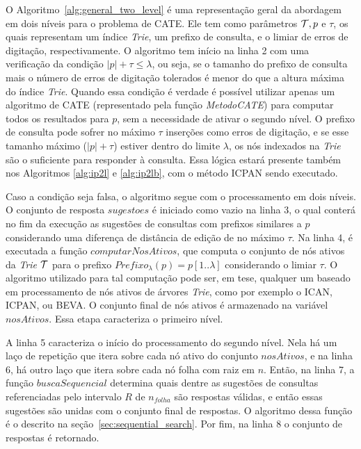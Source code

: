 O Algoritmo~\ref{alg:general_two_level} é uma representação geral da abordagem em dois níveis para o problema de CATE. Ele tem como parâmetros $\mathcal{T}, p$ e $\tau$, os quais representam um índice \textit{Trie}, um prefixo de consulta, e o limiar de erros de digitação, respectivamente. O algoritmo tem início na linha 2 com uma verificação da condição $|p| + \tau \leq \lambda$, ou seja, se o tamanho do prefixo de consulta mais o número de erros de digitação tolerados é menor do que a altura máxima do índice \textit{Trie}.
Quando essa condição é verdade é possível utilizar apenas um algoritmo de CATE (representado pela função \textit{MetodoCATE}) para computar todos os resultados para $p$, sem a necessidade de ativar o segundo nível. O prefixo de consulta pode sofrer no máximo $\tau$ inserções como erros de digitação, e se esse tamanho máximo ($|p| + \tau$) estiver dentro do limite $\lambda$, os nós indexados na \textit{Trie} são o suficiente para responder à consulta. Essa lógica estará presente também nos Algoritmos \ref{alg:ip2l} e \ref{alg:ip2lb}, com o método ICPAN sendo executado.

Caso a condição seja falsa, o algoritmo segue com o processamento em dois níveis. O conjunto de resposta $sugestoes$ é iniciado como vazio na linha 3, o qual conterá no fim da execução as sugestões de consultas com prefixos similares a $p$ considerando uma diferença de distância de edição de no máximo $\tau$. Na linha 4, é executada a função $computarNosAtivos$, que computa o conjunto de nós ativos da \textit{Trie} $\mathcal{T}$ para o prefixo $Prefixo_{\lambda}(p) = p[1..\lambda]$ considerando o limiar $\tau$. O algoritmo utilizado para tal computação pode ser, em tese, qualquer um baseado em processamento de nós ativos de árvores \textit{Trie}, como por exemplo o ICAN, ICPAN, ou BEVA. O conjunto final de nós ativos é armazenado na variável $nosAtivos$. Essa etapa caracteriza o primeiro nível. 

A linha 5 caracteriza o início do processamento do segundo nível. Nela há um laço de repetição que itera sobre cada nó ativo do conjunto $nosAtivos$, e na linha 6, há outro laço que itera sobre cada nó folha com raiz em $n$. Então, na linha 7, a função $buscaSequencial$ determina quais dentre as sugestões de consultas referenciadas pelo intervalo $R$ de $n_{folha}$ são respostas válidas, e então essas sugestões são unidas com o conjunto final de respostas. O algoritmo dessa função é o descrito na seção~\ref{sec:sequential_search}. Por fim, na linha 8 o conjunto de respostas é retornado.



